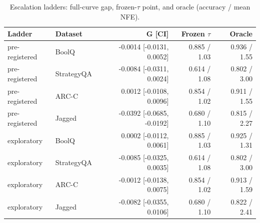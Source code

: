 \begin{table}[h!]
\centering
\small
\caption{Escalation ladders: full-curve gap, frozen-$\tau$ point, and oracle (accuracy / mean NFE).}
\label{tab:escalation}
\begin{tabular}{llrrr}
\toprule
Ladder & Dataset & G [CI] & Frozen $\tau$ & Oracle \\
\midrule
pre-registered & BoolQ & -0.0014 [-0.0131, 0.0052] & 0.885 / 1.03 & 0.936 / 1.55 \\
pre-registered & StrategyQA & -0.0084 [-0.0311, 0.0024] & 0.614 / 1.08 & 0.802 / 3.00 \\
pre-registered & ARC-C & 0.0012 [-0.0108, 0.0096] & 0.854 / 1.02 & 0.911 / 1.55 \\
pre-registered & Jagged & -0.0392 [-0.0685, -0.0192] & 0.680 / 1.10 & 0.815 / 2.27 \\
exploratory & BoolQ & 0.0002 [-0.0112, 0.0061] & 0.885 / 1.03 & 0.925 / 1.31 \\
exploratory & StrategyQA & -0.0085 [-0.0325, 0.0035] & 0.614 / 1.08 & 0.802 / 3.00 \\
exploratory & ARC-C & -0.0012 [-0.0138, 0.0075] & 0.854 / 1.02 & 0.913 / 1.59 \\
exploratory & Jagged & -0.0082 [-0.0355, 0.0106] & 0.680 / 1.10 & 0.822 / 2.41 \\
\bottomrule
\end{tabular}
\end{table}
